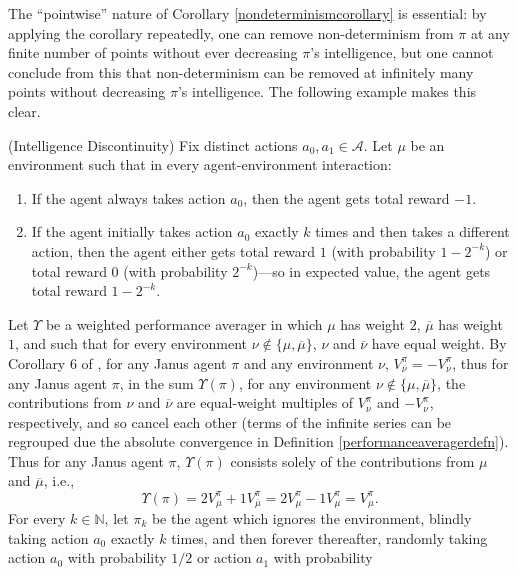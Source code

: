 \documentclass[runningheads]{llncs}
\begin{document}
The ``pointwise'' nature of Corollary \ref{nondeterminismcorollary}
is essential: by applying the corollary repeatedly, one can remove non-determinism
from $\pi$ at any finite number of points without ever decreasing $\pi$'s intelligence,
but one cannot conclude from this that non-determinism can be removed at infinitely
many points without decreasing $\pi$'s intelligence. The following example makes this
clear.

\begin{example}
    (Intelligence Discontinuity)
    Fix distinct actions $a_0,a_1\in\mathcal A$.
    Let $\mu$ be an environment such that in every agent-environment interaction:
    \begin{enumerate}
        \item If the agent always takes action $a_0$, then the agent gets total reward $-1$.
        \item If the agent initially takes action $a_0$ exactly $k$ times and
            then takes a different action, then the agent either
            gets total reward $1$ (with probability $1-2^{-k}$)
            or total reward $0$ (with probability $2^{-k}$)---so in expected
            value, the agent gets total reward $1-2^{-k}$.
    \end{enumerate}
    Let $\Upsilon$ be a weighted performance averager in which $\mu$ has weight $2$,
    $\overline\mu$ has weight $1$, and such that for every
    environment $\nu\not\in\{\mu,\overline{\mu}\}$, $\nu$ and $\overline{\nu}$ have
    equal weight.
    By Corollary 6 of \cite{alexander2021reward}, for any Janus agent $\pi$ and
    any environment $\nu$, $V^\pi_{\overline\nu}=-V^\pi_{\nu}$, thus for any Janus agent $\pi$,
    in the sum $\Upsilon(\pi)$, for any environment $\nu\not\in\{\mu,\overline{\mu}\}$,
    the contributions from $\nu$ and $\overline\nu$ are equal-weight multiples of
    $V^\pi_{\nu}$ and $-V^\pi_{\nu}$,
    respectively, and so cancel each other
    (terms of the infinite series can be regrouped due the absolute convergence
    in Definition \ref{performanceaveragerdefn}).
    Thus for any Janus agent $\pi$,
    $\Upsilon(\pi)$ consists solely of the contributions from $\mu$ and $\overline\mu$,
    i.e.,
    \[
        \Upsilon(\pi)=2V^\pi_\mu+1V^\pi_{\overline\mu}
        =2V^\pi_\mu-1V^\pi_{\mu}=V^\pi_\mu.
    \]
    For every $k\in\mathbb N$, let $\pi_k$ be the agent which ignores the environment,
    blindly taking action $a_0$ exactly $k$ times, and then forever thereafter,
    randomly taking action $a_0$ with probability $1/2$ or action $a_1$ with probability

\end{example}
\end{document}
